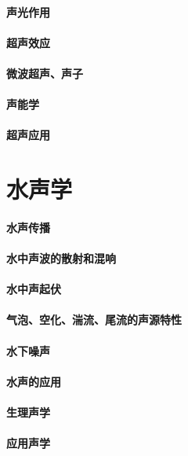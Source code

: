 \documentclass[UTF8]{../06-Physics}
\begin{document}
    \subsubsection{声光作用}
    \subsubsection{超声效应}
    \subsubsection{微波超声、声子}
    \subsubsection{声能学}
    \subsubsection{超声应用}



\chapter{水声学}
    \subsubsection{水声传播}
    \subsubsection{水中声波的散射和混响}
    \subsubsection{水中声起伏}
    \subsubsection{气泡、空化、湍流、尾流的声源特性}
    \subsubsection{水下噪声}
    \subsubsection{水声的应用}

    
\subsubsection{生理声学}
\subsubsection{应用声学}
\end{document}
